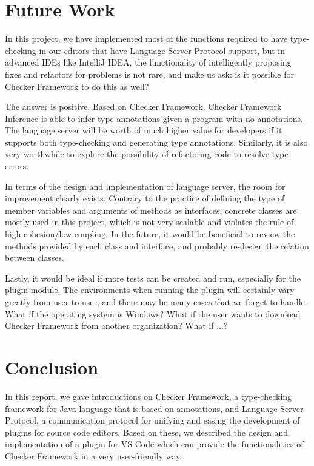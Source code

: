 \documentclass{article}
\begin{document}
\section{Future Work}

In this project, we have implemented most of the functions required to have type-checking in our editors that have Language Server Protocol support, but in advanced IDEs like IntelliJ IDEA, the functionality of intelligently proposing fixes and refactors for problems is not rare, and make us ask: is it possible for Checker Framework to do this as well?

The answer is positive. Based on Checker Framework, Checker Framework Inference\cite{cfi}\cite{cfirepo} is able to infer type annotations given a program with no annotations.  The language server will be worth of much higher value for developers if it supports both type-checking and generating type annotations.  Similarly, it is also very worthwhile to explore the possibility of refactoring code to resolve type errors.

In terms of the design and implementation of language server, the room for improvement clearly exists.  Contrary to the practice of defining the type of member variables and arguments of methods as interfaces, concrete classes are mostly used in this project, which is not very scalable and violates the rule of high cohesion/low coupling.  In the future, it would be beneficial to review the methods provided by each class and interface, and probably re-design the relation between classes.

Lastly, it would be ideal if more tests can be created and run, especially for the plugin module. The environments when running the plugin will certainly vary greatly from user to user, and there may be many cases that we forget to handle. What if the operating system is Windows? What if the user wants to download Checker Framework from another organization? What if ...?


\section{Conclusion}

In this report, we gave introductions on Checker Framework, a type-checking framework for Java language that is based on annotations, and Language Server Protocol, a communication protocol for unifying and easing the development of plugins for source code editors. Based on these, we described the design and implementation of a plugin for VS Code which can provide the functionalities of Checker Framework in a very user-friendly way.
\end{document}
